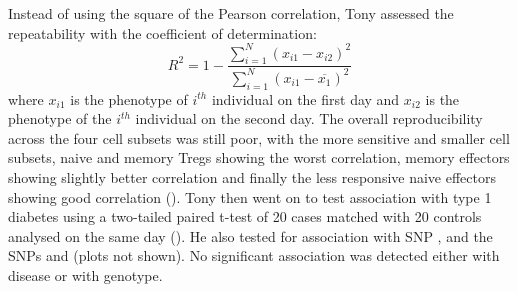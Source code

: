 Instead of using the square of the Pearson correlation, 
Tony assessed the repeatability with the coefficient of determination:
\[
  R^2 = 1 - \frac{\sum_{i=1}^N (x_{i1}-x_{i2})^2}{\sum_{i=1}^N (x_{i1}-\overline{x_1})^2}
\]
where $x_{i1}$ is the phenotype of $i^{th}$ individual on the first day and $x_{i2}$
is the phenotype of the $i^{th}$ individual on the second day.
The overall reproducibility across the four cell subsets was still poor,
with the more sensitive and smaller cell subsets,
naive and memory Tregs showing the worst correlation, memory effectors showing slightly better correlation and finally the less responsive naive
effectors showing good correlation ().
Tony then went on to test association with type 1 diabetes using a two-tailed paired t-test of 20 cases matched with 20 controls analysed on the same
day ().
He also tested for association with  SNP , and the
 SNPs  and  (plots not shown).
No significant association was detected either with disease or with genotype.

